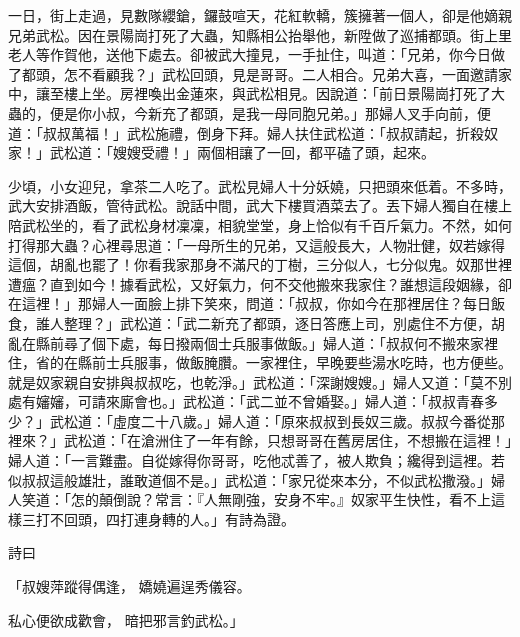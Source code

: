 一日，街上走過，見數隊纓鎗，鑼鼓喧天，花紅軟轎，簇擁著一個人，卻是他嫡親兄弟武松。因在景陽崗打死了大蟲，知縣相公抬舉他，新陞做了巡捕都頭。街上里老人等作賀他，送他下處去。卻被武大撞見，一手扯住，叫道：「兄弟，你今日做了都頭，怎不看顧我？」武松回頭，見是哥哥。二人相合。兄弟大喜，一面邀請家中，讓至樓上坐。房裡喚出金蓮來，與武松相見。因說道：「前日景陽崗打死了大蟲的，便是你小叔，今新充了都頭，是我一母同胞兄弟。」那婦人叉手向前，便道：「叔叔萬福！」武松施禮，倒身下拜。婦人扶住武松道：「叔叔請起，折殺奴家！」武松道：「嫂嫂受禮！」兩個相讓了一回，都平磕了頭，起來。

少頃，小女迎兒，拿茶二人吃了。武松見婦人十分妖嬈，只把頭來低着。不多時，武大安排酒飯，管待武松。說話中間，武大下樓買酒菜去了。丟下婦人獨自在樓上陪武松坐的，看了武松身材凜凜，相貌堂堂，身上恰似有千百斤氣力。不然，如何打得那大蟲？心裡尋思道：「一母所生的兄弟，又這般長大，人物壯健，奴若嫁得這個，胡亂也罷了！你看我家那身不滿尺的丁樹，三分似人，七分似鬼。奴那世裡遭瘟？直到如今！據看武松，又好氣力，何不交他搬來我家住？誰想這段姻緣，卻在這裡！」那婦人一面臉上排下笑來，問道：「叔叔，你如今在那裡居住？每日飯食，誰人整理？」武松道：「武二新充了都頭，逐日答應上司，別處住不方便，胡亂在縣前尋了個下處，每日撥兩個士兵服事做飯。」婦人道：「叔叔何不搬來家裡住，省的在縣前士兵服事，做飯腌臢。一家裡住，早晚要些湯水吃時，也方便些。就是奴家親自安排與叔叔吃，也乾淨。」武松道：「深謝嫂嫂。」婦人又道：「莫不別處有嬸嬸，可請來廝會也。」武松道：「武二並不曾婚娶。」婦人道：「叔叔青春多少？」武松道：「虛度二十八歲。」婦人道：「原來叔叔到長奴三歲。叔叔今番從那裡來？」武松道：「在滄洲住了一年有餘，只想哥哥在舊房居住，不想搬在這裡！」婦人道：「一言難盡。自從嫁得你哥哥，吃他忒善了，被人欺負；纔得到這裡。若似叔叔這般雄壯，誰敢道個不是。」武松道：「家兄從來本分，不似武松撒潑。」婦人笑道：「怎的顛倒說？常言：『人無剛強，安身不牢。』奴家平生快性，看不上這樣三打不回頭，四打連身轉的人。」有詩為證。

詩曰

「叔嫂萍蹤得偶逢，  嬌嬈遍逞秀儀容。

私心便欲成歡會，  暗把邪言釣武松。」

